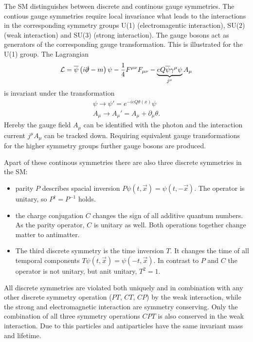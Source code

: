 The \ac{SM} distinguishes between discrete and continous gauge symmetries. The contious gauge symmetries require local invariance what
leads to the interactions in the corresponding symmetry groups U(1) (electromagentic interaction), SU(2) (weak interaction) and SU(3)
(strong interaction). The gauge bosons act as generators of the corresponding gauge transformation. This is illustrated for the U(1)
group. The Lagrangian
\begin{equation}
\mathcal{L}=\overline{\psi}\left(i\slashed{\partial} - m\right)\psi
- \frac{1}{4}F^{\mu\nu}F_{\mu\nu} - \underbrace{eQ\overline{\psi}\gamma^{\mu}\psi}_{j^{\mu}}A_{\mu}
\end{equation}
is invariant under the transformation
\begin{align}
\psi\rightarrow\psi'=e^{-ieQ\theta\left(x\right)}\psi\\
A_\mu\rightarrow A_\mu'=A_\mu+\partial_\mu\theta.
\end{align}
Hereby the gauge field $A_\mu$ can be identified with the photon and the interaction current $j^\mu A_\mu$ can be tracked down. Requiring
equivalent gauge transformations for the higher symmetry groups further gauge bosons are produced.

Apart of these continous symmetries there are also three discrete symmetries in the \ac{SM}:
\begin{itemize}
	\item parity $P$ describes spacial inversion $P\psi\left(t,\vec{x}\right) = \psi\left(t,-\vec{x}\right)$. The operator
		is unitary, so $P^{\dagger}=P^{-1}$ holds.
	\item the charge conjugation $C$ changes the sign of all additive quantum numbers. As the parity operator, $C$ is unitary as well. Both
		operations together change matter to antimatter.
	\item The third discrete symmetry is the time inversion $T$. It changes the time of all temporal components
		$T\psi\left(t,\vec{x}\right) = \psi\left(-t,\vec{x}\right)$. In contrast to $P$ and $C$ the operator is not unitary, but anit unitary,
		\ie $T^2=1$.
\end{itemize}
All discrete symmetries are violated both uniquely and in combination with any other discrete symmetry operation ($PT$, $CT$, $CP$) by the weak
interaction, while the strong and electromagnetic interaction are symmetry conserving. Only the combination of all three symmetry operations
$CPT$ is also conserved in the weak interaction. Due to this particles and antiparticles have the same invariant mass and lifetime.

